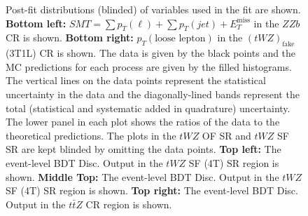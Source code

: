 \begin{figure}[htbp]
        \caption{Post-fit distributions (blinded) of variables used in the fit are shown. \textbf{Bottom left:} $SMT = \sum p_{T} (\ell) + \sum p_{T} (jet) + E_{T}^{\text{miss}}$ in the $ZZb$ CR is shown. \textbf{Bottom right:} $p_{T}(\text{loose lepton})$ in the $(tWZ)_{\text{fake}}$ (3T1L) CR is shown. The data is given by the black points and the MC predictions for each process are given by the filled histograms. The vertical lines on the data points represent the statistical uncertainty in the data and the diagonally-lined bands represent the total (statistical and systematic added in quadrature) uncertainty. The lower panel in each plot shows the ratios of the data to the theoretical predictions. The plots in the $tWZ$ OF SR and $tWZ$ SF SR are kept blinded by omitting the data points. \textbf{Top left:} The event-level BDT Disc. Output in the $tWZ$ SF (4T) SR region is shown. \textbf{Middle Top:} The event-level BDT Disc. Output in the $tWZ$ SF (4T) SR region is shown. \textbf{Top right:} The event-level BDT Disc. Output in the $t\bar{t}Z$ CR region is shown.}
  \label{fig:4lep-postfitPlots}
\end{figure}

